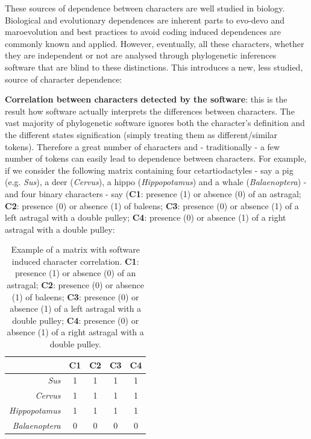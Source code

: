 \documentclass[12pt,letterpaper]{article}
\begin{document}
These sources of dependence between characters are well studied in biology.
Biological and evolutionary dependences are inherent parts to evo-devo and maroevolution and best practices to avoid coding induced dependences are commonly known and applied.
However, eventually, all these characters, whether they are independent or not are analysed through phylogenetic inferences software that are blind to these distinctions.
This introduces a new, less studied, source of character dependence:

\noindent \textbf{Correlation between characters detected by the software}: this is the result how software actually interprets the differences between characters.
The vast majority of phylogenetic software ignores both the character's definition and the different states signification (simply treating them as different/similar tokens).
Therefore a great number of characters and - traditionally - a few number of tokens can easily lead to dependence between characters.
For example, if we consider the following matrix containing four cetartiodactyles - say a pig (e.g. \textit{Sus}), a deer (\textit{Cervus}), a hippo (\textit{Hippopotamus}) and a whale (\textit{Balaenoptera}) - and four binary characters - say (\textbf{C1}: presence (1) or absence (0) of an astragal; \textbf{C2}: presence (0) or absence (1) of baleens; \textbf{C3}: presence (0) or absence (1) of a left astragal with a double pulley; \textbf{C4}: presence (0) or absence (1) of a right astragal with a double pulley:

\begin{table}
\center
    \begin{tabular}{r|cccc}
            & C1 & C2 & C3 & C4\\
        \hline
        \textit{Sus} & 1 & 1 & 1 & 1\\
        \textit{Cervus} & 1 & 1 & 1 & 1\\
        \textit{Hippopotamus} & 1 & 1 & 1 & 1\\
        \textit{Balaenoptera} & 0 & 0 & 0 & 0\\
    \end{tabular}
    \caption{Example of a matrix with software induced character correlation. \textbf{C1}: presence (1) or absence (0) of an astragal; \textbf{C2}: presence (0) or absence (1) of baleens; \textbf{C3}: presence (0) or absence (1) of a left astragal with a double pulley; \textbf{C4}: presence (0) or absence (1) of a right astragal with a double pulley.}
    \label{Tab:example_matrix}
\end{table}
\end{document}
